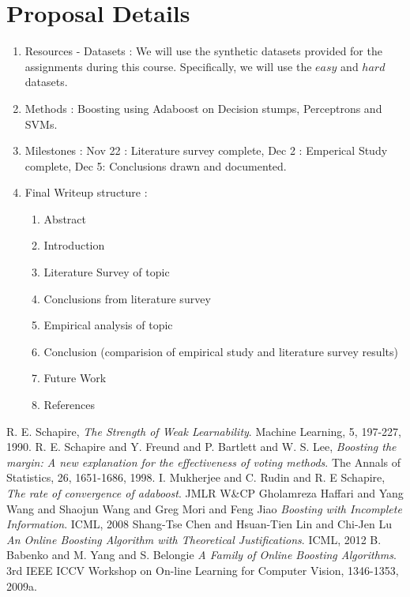 \documentclass[letterpaper,11pt]{article}
\begin{document}
\section{Proposal Details}
\begin{enumerate}
\item Resources - Datasets : We will use the synthetic datasets provided for the assignments during this course. Specifically, we will use the $easy$ and $hard$ datasets.
\item Methods : Boosting using Adaboost on Decision stumps, Perceptrons and SVMs.
\item Milestones : Nov 22 : Literature survey complete, Dec 2 : Emperical Study complete, Dec 5: Conclusions drawn and documented.
\item Final Writeup structure : 
\begin{enumerate}
\item Abstract
\item Introduction
\item Literature Survey of topic
\item Conclusions from literature survey
\item Empirical analysis of topic
\item Conclusion (comparision of empirical study and literature survey results)
\item Future Work
\item References
\end{enumerate}
\end{enumerate}

\begin{thebibliography}{9}

   R. E. Schapire,
  \emph{The  Strength  of Weak Learnability}.
  Machine Learning,
  5, 197-227,
  1990.
   R. E. Schapire and Y. Freund and P. Bartlett and W. S. Lee,
  \emph{Boosting the margin: A new explanation for the effectiveness of voting methods}.
  The Annals of Statistics,
  26, 1651-1686,
  1998.
   I. Mukherjee and C. Rudin and R. E Schapire,
  \emph{The rate of convergence of adaboost}.
  JMLR W\&CP
   Gholamreza Haffari and Yang Wang and Shaojun Wang and Greg Mori and Feng Jiao
  \emph{Boosting with Incomplete Information}.
  ICML, 
  2008
  Shang-Tse Chen and Hsuan-Tien Lin and Chi-Jen Lu
  \emph{An Online Boosting Algorithm with Theoretical Justifications}.
  ICML, 
  2012
  B. Babenko and M. Yang and S. Belongie
  \emph{A Family of Online Boosting Algorithms}.
  3rd IEEE ICCV Workshop on On-line Learning for Computer Vision, 
  1346-1353, 2009a.

\end{thebibliography}
\end{document}
